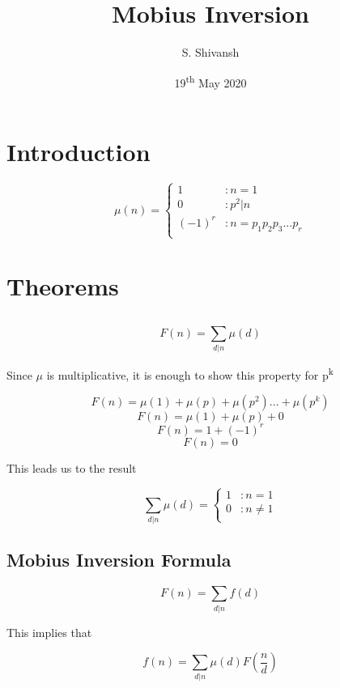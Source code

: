 \documentclass{article}
\title{Mobius Inversion}
\author{ S. Shivansh }
\date{ 19\textsuperscript{th} May 2020}
\begin{document}
\maketitle

\section{Introduction}

\[
    \mu(n) = 
    \begin{cases}
    1     &: n = 1\\ 
    0     &: p^2\vert n\\
    (-1)^r  &: n = p_1p_2p_3. . . p_r\\ 
     \end{cases}
\]

\section{Theorems}

\subsection{}\label{Lemma 1}
\[
    F(n) = \sum_{d\vert n} \mu(d)
\]

Since \(\mu\) is multiplicative, it is enough to show this property for p\textsuperscript{k}

\[
    F(n) = \mu(1) + \mu(p) + \mu(p^2) . . . + \mu(p^k)
\]
\[
    F(n) = \mu(1) + \mu(p) + 0
\]
\[  
    F(n) = 1 + (-1)^r
\]
\[
    F(n) = 0
\]

This leads us to the result

\[
    \sum_{d\vert n} \mu(d) = 
    \begin{cases}
    1     &: n = 1\\ 
    0     &: n \neq 1\\
     \end{cases}
\]

\subsection{Mobius Inversion Formula}

\begin{equation}\label{2.2_1}
    F(n) = \sum_{d\vert n} f(d)
\end{equation}

This implies that

\[
    f(n) = \sum_{d\vert n} \mu(d) F(\frac{n}{d})
\]
\end{document}
